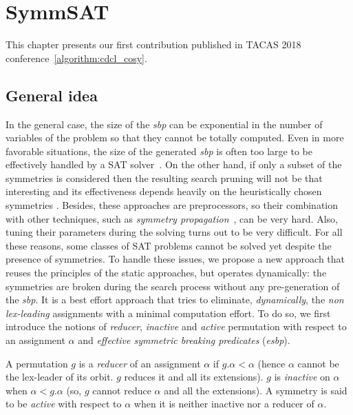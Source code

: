 \chapter{SymmSAT}\label{chap:symmSAT}


This chapter presents our first contribution published in TACAS 2018 conference~\ref{algorithm:cdcl_cosy}. 

\section{General idea}
In the general case,
the size of the \textit{sbp} can be exponential in the number of variables of
the problem so that they cannot be totally computed. Even in more favorable
situations, the size of the generated \textit{sbp} is often too large to be
effectively handled by a SAT solver~\cite{Luks2004}. On the other hand, if
only a subset of the symmetries is considered then the resulting search pruning
will not be that interesting and its effectiveness depends heavily on the
heuristically chosen symmetries \cite{biere2009handbook}. Besides, these approaches
are preprocessors, so their combination with other techniques, such as
\emph{symmetry propagation}~\cite{Devriendt12}, can be very hard. Also, tuning
their parameters during the solving turns out to be very difficult. For all
these reasons, some classes of SAT problems cannot be solved yet despite
the presence of symmetries.
To handle these issues, we propose a new
approach that reuses the principles of the static approaches, but operates
dynamically: the symmetries are broken during the search process without any
pre-generation of the \textit{sbp}. It is a best effort approach that tries to eliminate,
\textit{dynamically}, the \textit{non lex-leading} assignments with a minimal
computation effort. To do so, we first introduce the notions of
\textit{reducer}, \textit{inactive} and \textit{active} permutation with
respect to an assignment $\alpha$ and \emph{effective symmetric breaking predicates} (\emph{esbp}).


\begin{definition}
	 A permutation $g$	is a \emph{reducer} of an assignment $\alpha$ if $g.\alpha < \alpha$ 
	 (hence $\alpha$ cannot be the lex-leader of its orbit. $g$ reduces it and all its extensions). $g$ is
	\emph{inactive} on $\alpha$ when $\alpha < g.\alpha$ (so, $g$ cannot reduce $\alpha$ and all
	the extensions). A symmetry is said to be \emph{active} with respect to $\alpha$
	when it is neither inactive nor a reducer of $\alpha$. 
\end{definition}

